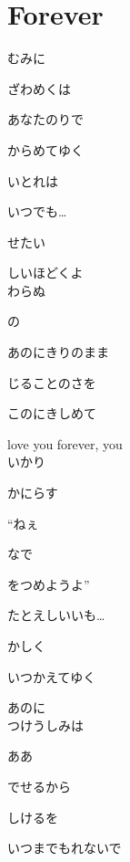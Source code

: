 \section{ Forever}
\large{

むみに

ざわめくは

あなたのりで

からめてゆく

いとれは

いつでも…


せたい

しいほどくよ
\\

わらぬ

の

あのにきりのまま

じることのさを

このにきしめて

love you forever, you
\\

いかり

かにらす

“ねぇ

なで

をつめようよ”

たとえしいいも…


かしく

いつかえてゆく

あのに
\\

つけうしみは

ああ

でせるから

しけるを

いつまでもれないで

}
